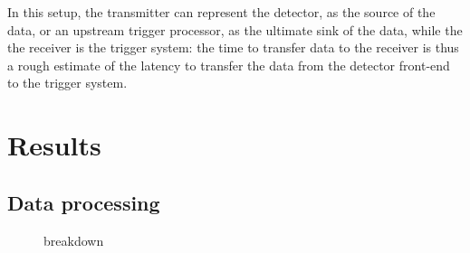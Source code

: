 \documentclass[letterpaper]{jpconf}
\begin{document}
In this setup, the transmitter can represent the detector, as
the source of the data, or an upstream trigger processor, as
the ultimate sink of the data, while the the receiver is the
trigger system: the time to transfer data to the receiver is thus a
rough estimate of the latency to transfer the data from the detector
front-end to the trigger system.

\section{Results}

\subsection{Data processing}


\begin{figure}[!t]
\centering
{}
\hspace{1mm}
\caption{breakdown}
\end{figure}
\end{document}
